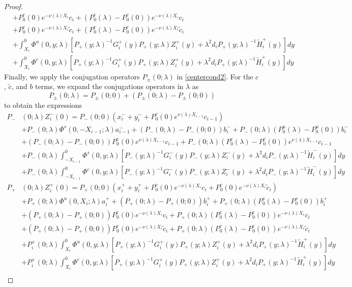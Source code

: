 \documentclass[thesis.tex]{subfiles}
\begin{document}
\begin{lemma}
\begin{proof}
\begin{align*}
&+ P_0^c(0) e^{-\nu(\lambda)X_i} c_i + (P_0^c(\lambda) - P_0^c(0)) e^{-\nu(\lambda)X_i} c_i \\
&+ P_0^c(0) e^{-\nu(\lambda)X_i} \tilde{c}_i + (P_0^c(\lambda) - P_0^c(0)) e^{-\nu(\lambda)X_i} \tilde{c}_i \\
&+ \int_{X_i}^0 \Phi^u(0, y; \lambda) [P_+(y; \lambda)^{-1} G_i^+(y) P_+(y; \lambda) Z_i^+(y) + \lambda^2 d_i P_+(y; \lambda)^{-1} \tilde{H}_i^+(y)] dy \\
&+ \int_{X_i}^0 \Phi^c(0, y; \lambda) [P_+(y; \lambda)^{-1} G_i^+(y) P_+(y; \lambda) Z_i^+(y) + \lambda^2 d_i P_+(y; \lambda)^{-1} \tilde{H}_i^+(y)] dy 
\end{align*}
Finally, we apply the conjugation operators $P_\pm(0; \lambda)$ in \eqref{centercond2}. For the $c$, $\tilde{c}$, and $b$ terms, we expand the conjugations operators in $\lambda$ as
\[
P_\pm(0; \lambda) = P_\pm(0; 0) + (P_\pm(0; \lambda) - P_\pm(0; 0))
\]
to obtain the expressions
\begin{align*}
P_-&(0; \lambda) Z_i^-(0) = P_-(0; 0)( x_i^- + y_i^- + P_0^c(0) e^{\nu(\lambda) X_{i-1}} c_{i-1} ) \\
&+ P_-(0; \lambda) \Phi^s(0, -X_{i-1}; \lambda) a_{i-1}^- + (P_-(0; \lambda) - P_-(0; 0))b_i^- + P_-(0; \lambda)(P_0^u(\lambda) - P_0^u(0))b_i^- \\
&+ (P_-(0; \lambda) - P_-(0; 0)) P_0^c(0) e^{\nu(\lambda) X_{i-1}} c_{i-1} + P_-(0; \lambda) (P_0^c(\lambda) - P_0^c(0)) e^{\nu(\lambda) X_{i-1}} c_{i-1} \\
&+ P_-(0; \lambda) \int_{-X_{i-1}}^0 \Phi^s(0, y; \lambda) [P_-(y; \lambda)^{-1} G_i^-(y) P_-(y; \lambda)Z_i^-(y) + \lambda^2 d_i P_-(y; \lambda)^{-1} \tilde{H}_i^-(y)] dy \\
&+ P_-(0; \lambda) \int_{-X_{i-1}}^0 \Phi^c(0, y; \lambda) [P_-(y; \lambda)^{-1} G_i^-(y) P_-(y; \lambda)Z_i^-(y) + \lambda^2 d_i P_-(y; \lambda)^{-1} \tilde{H}_i^-(y)] dy  \\ 
P_+&(0; \lambda) Z_i^+(0) = P_+(0; 0)( x_i^+ + y_i^+ + P_0^c(0) e^{-\nu(\lambda)X_i} c_i + P_0^c(0) e^{-\nu(\lambda)X_i} \tilde{c}_i )\\
&+ P_+(0; \lambda) \Phi^u(0, X_i; \lambda) a_i^+ + (P_+(0; \lambda) - P_+(0; 0)) b_i^+ + P_+(0; \lambda) (P_0^s(\lambda) - P_0^s(0)) b_i^+ \\
&+ (P_+(0; \lambda) - P_+(0; 0))P_0^c(0) e^{-\nu(\lambda)X_i} c_i + P_+(0; \lambda) (P_0^c(\lambda) - P_0^c(0)) e^{-\nu(\lambda)X_i} c_i \\
&+ (P_+(0; \lambda) - P_+(0; 0))P_0^c(0) e^{-\nu(\lambda)X_i} \tilde{c}_i + P_+(0; \lambda) (P_0^c(\lambda) - P_0^c(0)) e^{-\nu(\lambda)X_i} \tilde{c}_i \\
&+ P_i^+(0; \lambda) \int_{X_i}^0 \Phi^u(0, y; \lambda) [P_+(y; \lambda)^{-1} G_i^+(y) P_+(y; \lambda) Z_i^+(y) + \lambda^2 d_i P_+(y; \lambda)^{-1} \tilde{H}_i^+(y)] dy \\
&+ P_i^+(0; \lambda) \int_{X_i}^0 \Phi^c(0, y; \lambda) [P_+(y; \lambda)^{-1} G_i^+(y) P_+(y; \lambda) Z_i^+(y) + \lambda^2 d_i P_+(y; \lambda)^{-1} \tilde{H}_i^+(y)] dy \\
\end{align*}


\end{proof}
\end{lemma}
\end{document}
